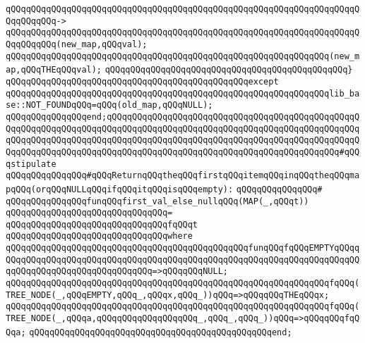 \verb|qQQqqQQqqQQqqQQqqQQqqQQqqQQqqQQqqQQqqQQqqQQqqQQqqQQqqQQqqQQqqQQqqQQqqQQqqQQqqQQq->|\newline
\verb|qQQqqQQqqQQqqQQqqQQqqQQqqQQqqQQqqQQqqQQqqQQqqQQqqQQqqQQqqQQqqQQqqQQqqQQqqQQqqQQq(new_map,qQQqval);|\newline
\newline
\verb|qQQqqQQqqQQqqQQqqQQqqQQqqQQqqQQqqQQqqQQqqQQqqQQqqQQqqQQqqQQqqQQq(new_map,qQQqTHEqQQqval);|\newline
\verb|qQQqqQQqqQQqqQQqqQQqqQQqqQQqqQQqqQQqqQQqqQQqqQQq}|\newline
\verb|qQQqqQQqqQQqqQQqqQQqqQQqqQQqqQQqqQQqqQQqqQQqqQQqexcept|\newline
\verb|qQQqqQQqqQQqqQQqqQQqqQQqqQQqqQQqqQQqqQQqqQQqqQQqqQQqqQQqqQQqqQQqlib_base::NOT_FOUNDqQQq=qQQq(old_map,qQQqNULL);|\newline
\verb|qQQqqQQqqQQqqQQqend;qQQqqQQqqQQqqQQqqQQqqQQqqQQqqQQqqQQqqQQqqQQqqQQqqQQqqQQqqQQqqQQqqQQqqQQqqQQqqQQqqQQqqQQqqQQqqQQqqQQqqQQqqQQqqQQqqQQqqQQqqQQqqQQqqQQqqQQqqQQqqQQqqQQqqQQqqQQqqQQqqQQqqQQqqQQqqQQqqQQqqQQqqQQqqQQqqQQqqQQqqQQqqQQqqQQqqQQqqQQqqQQqqQQqqQQqqQQqqQQqqQQqqQQqqQQqqQQq#qQQqstipulate|\newline
\newline
\newline
\verb|qQQqqQQqqQQqqQQq#qQQqReturnqQQqtheqQQqfirstqQQqitemqQQqinqQQqtheqQQqmapqQQq(orqQQqNULLqQQqifqQQqitqQQqisqQQqempty):|\newline
\verb|qQQqqQQqqQQqqQQq#|\newline
\verb|qQQqqQQqqQQqqQQqfunqQQqfirst_val_else_nullqQQq(MAP(_,qQQqt))|\newline
\verb|qQQqqQQqqQQqqQQqqQQqqQQqqQQqqQQq=|\newline
\verb|qQQqqQQqqQQqqQQqqQQqqQQqqQQqqQQqfqQQqt|\newline
\verb|qQQqqQQqqQQqqQQqqQQqqQQqqQQqqQQqwhere|\newline
\verb|qQQqqQQqqQQqqQQqqQQqqQQqqQQqqQQqqQQqqQQqqQQqqQQqfunqQQqfqQQqEMPTYqQQqqQQqqQQqqQQqqQQqqQQqqQQqqQQqqQQqqQQqqQQqqQQqqQQqqQQqqQQqqQQqqQQqqQQqqQQqqQQqqQQqqQQqqQQqqQQqqQQqqQQq=>qQQqqQQqNULL;|\newline
\verb|qQQqqQQqqQQqqQQqqQQqqQQqqQQqqQQqqQQqqQQqqQQqqQQqqQQqqQQqqQQqqQQqfqQQq(TREE_NODE(_,qQQqEMPTY,qQQq_,qQQqx,qQQq_))qQQq=>qQQqqQQqTHEqQQqx;|\newline
\verb|qQQqqQQqqQQqqQQqqQQqqQQqqQQqqQQqqQQqqQQqqQQqqQQqqQQqqQQqqQQqqQQqfqQQq(TREE_NODE(_,qQQqa,qQQqqQQqqQQqqQQqqQQq_,qQQq_,qQQq_))qQQq=>qQQqqQQqfqQQqa;|\newline
\verb|qQQqqQQqqQQqqQQqqQQqqQQqqQQqqQQqqQQqqQQqqQQqqQQqend;|\newline
